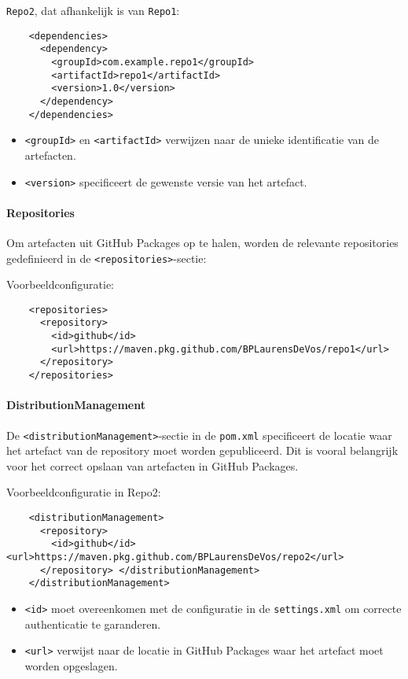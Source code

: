\texttt{Repo2}, dat afhankelijk is van \texttt{Repo1}:
\begin{verbatim}
    <dependencies>
      <dependency>
        <groupId>com.example.repo1</groupId>
        <artifactId>repo1</artifactId>
        <version>1.0</version>
      </dependency>
    </dependencies>
\end{verbatim}

\begin{itemize}
    \item \texttt{<groupId>} en \texttt{<artifactId>} verwijzen naar de unieke identificatie van de artefacten.
    \item \texttt{<version>} specificeert de gewenste versie van het artefact.
\end{itemize}

\paragraph{Repositories}
Om artefacten uit GitHub Packages op te halen, worden de relevante repositories gedefinieerd in de \texttt{<repositories>}-sectie:

Voorbeeldconfiguratie:
\begin{verbatim}
    <repositories>
      <repository>
        <id>github</id>
        <url>https://maven.pkg.github.com/BPLaurensDeVos/repo1</url>
      </repository>
    </repositories>
\end{verbatim}

\paragraph{DistributionManagement} 
De \texttt{<distributionManagement>}-sectie in de \texttt{pom.xml} specificeert de locatie waar het artefact van de repository moet worden gepubliceerd. Dit is vooral belangrijk voor het correct opslaan van artefacten in GitHub Packages.

Voorbeeldconfiguratie in Repo2:
\begin{verbatim} 
    <distributionManagement>
      <repository> 
        <id>github</id> <url>https://maven.pkg.github.com/BPLaurensDeVos/repo2</url>
      </repository> </distributionManagement> 
    </distributionManagement>
\end{verbatim}

\begin{itemize} 
    \item \texttt{<id>} moet overeenkomen met de configuratie in de \texttt{settings.xml} om correcte authenticatie te garanderen.
    \item \texttt{<url>} verwijst naar de locatie in GitHub Packages waar het artefact moet worden opgeslagen. 
\end{itemize}

